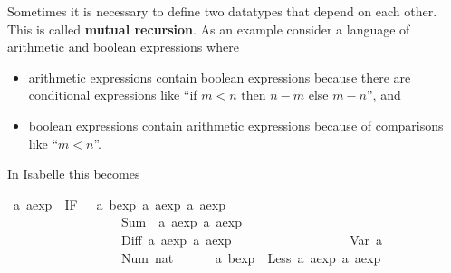 %
\begin{isabellebody}%
\def\isabellecontext{ABexpr}%
%
\isadelimtheory
%
\endisadelimtheory
%
\isatagtheory
%
\endisatagtheory
{\isafoldtheory}%
%
\isadelimtheory
%
\endisadelimtheory
%
\begin{isamarkuptext}%
%
Sometimes it is necessary to define two datatypes that depend on each
other. This is called \textbf{mutual recursion}. As an example consider a
language of arithmetic and boolean expressions where
\begin{itemize}
\item arithmetic expressions contain boolean expressions because there are
  conditional expressions like ``if $m<n$ then $n-m$ else $m-n$'',
  and
\item boolean expressions contain arithmetic expressions because of
  comparisons like ``$m<n$''.
\end{itemize}
In Isabelle this becomes%
\end{isamarkuptext}%
\isamarkuptrue%
\isamarkupfalse%
\ {}a\ aexp\ {}\ IF\ \ \ {}{}a\ bexp{}\ {}{}a\ aexp{}\ {}{}a\ aexp{}\isanewline
\ \ \ \ \ \ \ \ \ \ \ \ \ \ \ \ \ {}\ Sum\ \ {}{}a\ aexp{}\ {}{}a\ aexp{}\isanewline
\ \ \ \ \ \ \ \ \ \ \ \ \ \ \ \ \ {}\ Diff\ {}{}a\ aexp{}\ {}{}a\ aexp{}\isanewline
\ \ \ \ \ \ \ \ \ \ \ \ \ \ \ \ \ {}\ Var\ {}a\isanewline
\ \ \ \ \ \ \ \ \ \ \ \ \ \ \ \ \ {}\ Num\ nat\isanewline
{}\ \ \ \ \ \ {}a\ bexp\ {}\ Less\ {}{}a\ aexp{}\ {}{}a\ aexp{}\isanewline

\end{isabellebody}
